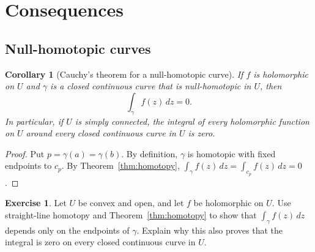 \documentclass[11pt]{article}
\theoremstyle{plain}
\newtheorem{corollary}[theorem]{Corollary}
\theoremstyle{definition}
\newtheorem{exercise}[theorem]{Exercise}
\theoremstyle{remark}
\numberwithin{equation}{section}
\begin{document}
\section{Consequences}
\subsection{Null-homotopic curves}
\begin{corollary}[Cauchy's theorem for a null-homotopic curve]
If $f$ is holomorphic on $U$ and $\gamma$ is a closed continuous curve
that is null-homotopic in $U$, then
\[
 \int_\gamma f(z)\,dz=0.
\]
In particular, if $U$ is simply connected, the integral of every
holomorphic function on $U$ around every closed continuous curve in $U$
is zero.
\end{corollary}
\begin{proof}
Put $p=\gamma(a)=\gamma(b)$. By definition, $\gamma$ is homotopic
with fixed endpoints to $c_p$. By Theorem~\ref{thm:homotopy},
$\int_\gamma f(z)\,dz=\int_{c_p}f(z)\,dz=0$.
\end{proof}

\begin{exercise}
Let $U$ be convex and open, and let $f$ be holomorphic on $U$.
Use straight-line homotopy and Theorem~\ref{thm:homotopy} to show that
$\int_\gamma f(z)\,dz$ depends only on the endpoints of $\gamma$.
Explain why this also proves that the integral is zero on every closed
continuous curve in $U$.
\end{exercise}
\end{document}
